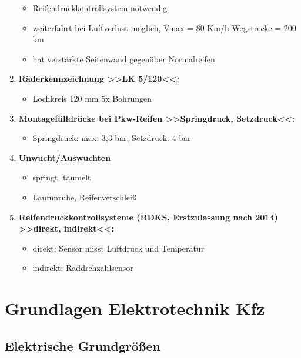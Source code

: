 \begin{enumerate}
  \begin{itemize}
  \item
    Reifendruckkontrollsystem notwendig
  \item
    weiterfahrt bei Luftverlust möglich, Vmax = 80 Km/h Wegstrecke = 200
    km
  \item
    hat verstärkte Seitenwand gegenüber Normalreifen
  \end{itemize}
\item
  \textbf{Räderkennzeichnung >>LK 5/120<<:}

  \begin{itemize}
  \item
    Lochkreis 120 mm 5x Bohrungen
  \end{itemize}
\item
  \textbf{Montagefülldrücke bei Pkw-Reifen >>Springdruck, Setzdruck<<:}

  \begin{itemize}
  \item
    Springdruck: max. 3,3 bar, Setzdruck: 4 bar
  \end{itemize}
\item
  \textbf{Unwucht/Auswuchten}

  \begin{itemize}
  \item
    springt, taumelt
  \item
    Laufunruhe, Reifenverschleiß
  \end{itemize}
\item
  \textbf{Reifendruckkontrollsysteme (RDKS, Erstzulassung nach 2014)
  >>direkt, indirekt<<:}

  \begin{itemize}
  \item
    direkt: Sensor misst Luftdruck und Temperatur
  \item
    indirekt: Raddrehzahlsensor
  \end{itemize}
\end{enumerate}

\section{Grundlagen Elektrotechnik
Kfz}\label{grundlagen-elektrotechnik-kfz}

\subsection{Elektrische
Grundgrößen}\label{elektrische-grundgroessen}

